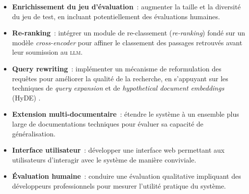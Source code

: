 \documentclass[12pt,a4paper,oneside]{report}
\newcommand{\llm}{\textsc{llm}}
\begin{document}
\begin{itemize}
  \item \textbf{Enrichissement du jeu d'évaluation}~: augmenter la taille et la diversité du jeu de test, en incluant potentiellement des évaluations humaines.
  \item \textbf{Re-ranking}~: intégrer un module de re-classement (\textit{re-ranking}) fondé sur un modèle \textit{cross-encoder} pour affiner le classement des passages retrouvés avant leur soumission au \llm{}.
  \item \textbf{Query rewriting}~: implémenter un mécanisme de reformulation des requêtes pour améliorer la qualité de la recherche, en s'appuyant sur les techniques de \textit{query expansion} et de \textit{hypothetical document embeddings} (HyDE) \citep{gao2024}.
  \item \textbf{Extension multi-documentaire}~: étendre le système à un ensemble plus large de documentations techniques pour évaluer sa capacité de généralisation.
  \item \textbf{Interface utilisateur}~: développer une interface web permettant aux utilisateurs d'interagir avec le système de manière conviviale.
  \item \textbf{Évaluation humaine}~: conduire une évaluation qualitative impliquant des développeurs professionnels pour mesurer l'utilité pratique du système.
\end{itemize}




\end{document}
